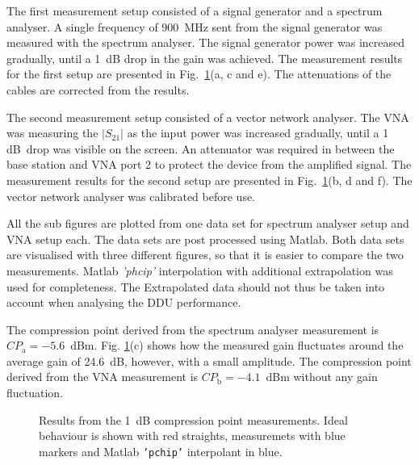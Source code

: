 \documentclass[a4paper, 12pt]{article}
\begin{document}
The first measurement setup consisted of a signal generator and a spectrum analyser. A single 
frequency of 900~MHz sent from the signal generator was measured with the spectrum analyser. 
The signal generator power was increased gradually, until a 1~dB drop in the gain was achieved. 
The measurement results for the first setup are presented in Fig.~\ref{f:1dB}(a, c and e). 
The attenuations of the cables are corrected from the results.

The second measurement setup consisted of a vector network analyser. The VNA was measuring 
the $|S_{21}|$ as the input power was increased gradually, until a 1 dB~drop was visible 
on the screen. An attenuator was required in between the base station and VNA port 2 
to protect the device from the amplified signal. The measurement results for the second setup 
are presented in Fig.~\ref{f:1dB}(b, d and f). The vector network analyser was calibrated 
before use. 

All the sub figures are plotted from one data set for spectrum analyser setup and VNA setup each. 
The data sets are post processed using Matlab. Both data sets are visualised with three different 
figures, so that it is easier to compare the two measurements. Matlab \textit{'phcip'} interpolation with 
additional extrapolation was used for completeness. The Extrapolated data should not thus be taken 
into account when analysing the DDU performance.

The compression point derived from the spectrum analyser measurement is \linebreak{}$CP_\mathrm{a} = -5.6$~dBm. 
Fig. \ref{f:1dB}(c) shows how the measured gain fluctuates around the average gain of 24.6~dB, 
however, with a small amplitude. The compression point derived from the VNA measurement is 
$CP_\mathrm{b} = -4.1$~dBm without any gain fluctuation.


\begin{figure}
\centering
{}
\caption{Results from the 1~dB compression point measurements. Ideal behaviour is shown with red straights, 
	measuremets with blue markers and Matlab \texttt{'pchip'} interpolant in blue.}\label{f:1dB}
\end{figure}
\end{document}
